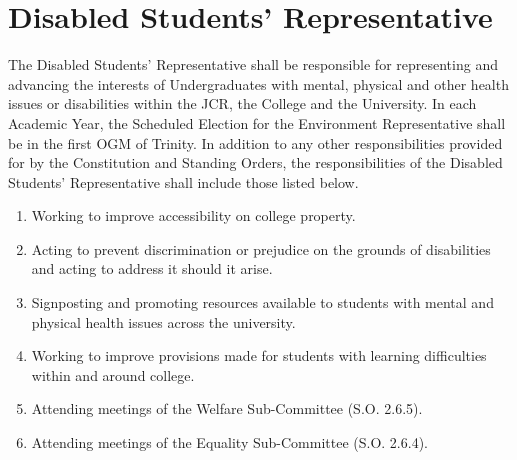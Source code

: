 \section{Disabled Students' Representative}
\npara The Disabled Students' Representative shall be responsible for representing and advancing the interests of Undergraduates with mental, physical and other health issues or disabilities within the JCR, the College and the University. 
\npara In each Academic Year, the Scheduled Election for the Environment Representative shall be in the first OGM of Trinity.
\npara In addition to any other responsibilities provided for by the Constitution and Standing Orders, the responsibilities of the Disabled Students' Representative shall include those listed below.
\begin{enumerate}
	\item Working to improve accessibility on college property.
	\item Acting to prevent discrimination or prejudice on the grounds of disabilities and acting to address it should it arise.
	\item Signposting and promoting resources available to students with mental and physical health issues across the university.
	\item Working to improve provisions made for students with learning difficulties within and around college.
	\item Attending meetings of the Welfare Sub-Committee (S.O. 2.6.5).
	\item Attending meetings of the Equality Sub-Committee (S.O. 2.6.4).
\end{enumerate}

